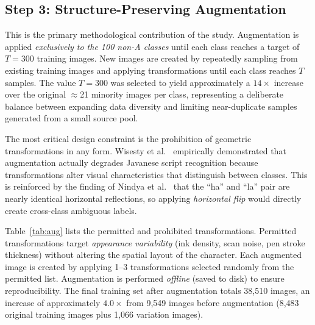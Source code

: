 \documentclass[conference]{IEEEtran}
\begin{document}
\subsection{Step 3: Structure-Preserving Augmentation}

This is the primary methodological contribution of the study.
Augmentation is applied \textit{exclusively to the 100 non-A classes}
until each class reaches a target of $T = 300$ training images.
New images are created by repeatedly sampling from existing training
images and applying transformations until each class reaches $T$
samples.
The value $T = 300$ was selected to yield approximately a $14\times$
increase over the original $\approx$21 minority images per class,
representing a deliberate balance between expanding data diversity
and limiting near-duplicate samples generated from a small source pool.

The most critical design constraint is the prohibition of geometric
transformations in any form.
Wisesty et al.~\cite{wisesty2026} empirically demonstrated that
augmentation actually degrades Javanese script recognition because
transformations alter visual characteristics that distinguish between
classes.
This is reinforced by the finding of Nindya et al.~\cite{nindya2025}
that the ``ha'' and ``la'' pair are nearly identical horizontal
reflections, so applying \textit{horizontal flip} would directly
create cross-class ambiguous labels.

Table~\ref{tab:aug} lists the permitted and prohibited transformations.
Permitted transformations target \textit{appearance variability}
(ink density, scan noise, pen stroke thickness) without altering the
spatial layout of the character.
Each augmented image is created by applying 1--3 transformations
selected randomly from the permitted list.
Augmentation is performed \textit{offline} (saved to disk) to ensure
reproducibility.
The final training set after augmentation totals 38,510 images,
an increase of approximately $4.0\times$ from 9,549 images before
augmentation (8,483 original training images plus 1,066 variation
images).
\end{document}

